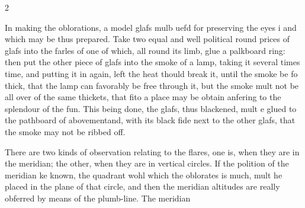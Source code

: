 \documentclass[10pt]{article}
\begin{document}
\begin{multicols}{2}
\begin{itemize}
\end{itemize}
In making the oblorations, a model glafs mulb uefd for preserving the eyes i and which may be thus prepared. Take two equal and well political round prices of glafs into the farles of one of which, all round its limb, glue a palkboard ring: then put the other piece of glafs into the smoke of a lamp, taking it several times time, and putting it in again, left the heat thould break it, until the smoke be fo thick, that the lamp can favorably be free through it, but the smoke mult not be all over of the same thickets, that fito a place may be obtain anfering to the splendour of the fun. This being done, the glafs, thus blackened, mult e glued to the pathboard of abovementand, with its black fide next to the other glafs, that the smoke may not be ribbed off.

There are two kinds of observation relating to the flares, one is, when they are in the meridian; the other, when they are in vertical circles. If the polition of the meridian ke known, the quadrant wohl which the oblorates is much, mult he placed in the plane of that circle, and then the meridian altitudes are really obferred by means of the plumb-line. The meridian


\end{multicols}
\end{document}
